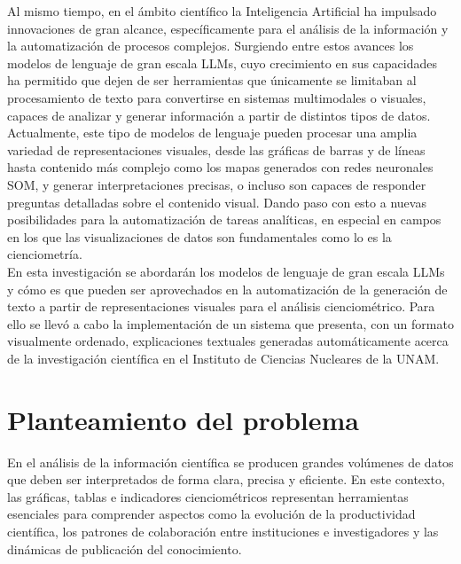 \documentclass[letterpaper,spanish,12pt]{book}
\begin{document}
    \noindent Al mismo tiempo, en el ámbito científico la Inteligencia Artificial ha impulsado innovaciones de gran alcance, específicamente para el análisis de la información y la automatización de procesos complejos. Surgiendo entre estos avances los modelos de lenguaje de gran escala LLMs, cuyo crecimiento en sus capacidades ha permitido que dejen de ser herramientas que únicamente se limitaban al procesamiento de texto para convertirse en sistemas multimodales o visuales, capaces de analizar y generar información a partir de distintos tipos de datos. \\
    
    \noindent Actualmente, este tipo de modelos de lenguaje pueden procesar una amplia variedad de representaciones visuales, desde las gráficas de barras y de líneas hasta contenido más complejo como los mapas generados con redes neuronales SOM, y generar interpretaciones precisas, o incluso son capaces de responder preguntas detalladas sobre el contenido visual. Dando paso con esto a nuevas posibilidades para la automatización de tareas analíticas, en especial en campos en los que las visualizaciones de datos son fundamentales como lo es la cienciometría. \\

    \noindent En esta investigación se abordarán los modelos de lenguaje de gran escala LLMs y cómo es que pueden ser aprovechados en la automatización de la generación de texto a partir de representaciones visuales para el análisis cienciométrico. Para ello se llevó a cabo la implementación de un sistema que presenta, con un formato visualmente ordenado, explicaciones textuales generadas automáticamente acerca de la investigación científica en el Instituto de Ciencias Nucleares de la UNAM.
    
    \section{Planteamiento del problema}

    En el análisis de la información científica se producen grandes volúmenes de datos que deben ser interpretados de forma clara, precisa y eficiente. En este contexto, las gráficas, tablas e indicadores cienciométricos representan herramientas esenciales para comprender aspectos como la evolución de la productividad científica, los patrones de colaboración entre instituciones e investigadores y las dinámicas de publicación del conocimiento. \\
    
\end{document}
